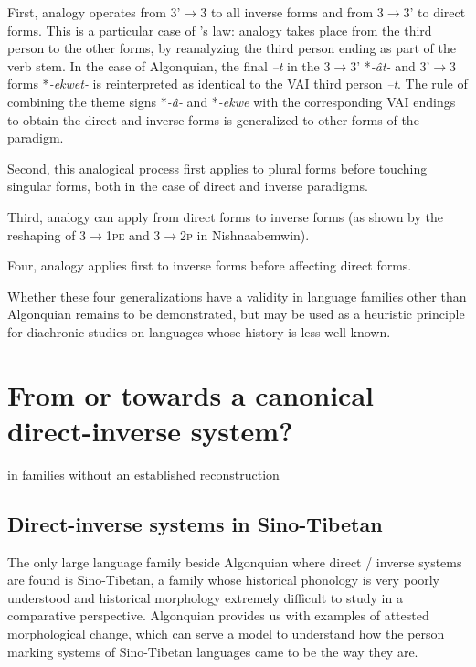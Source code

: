 \documentclass[twoside,a4paper,11pt]{article}
\newcommand{\ipa}[1]{{\phon\textit{#1}}}
\newcommand{\Σ}{\greek{Σ}}
\begin{document}
First, analogy operates from 3'$\rightarrow$3 to all inverse forms and from 3$\rightarrow$3' to direct forms. This is a particular case of   \citealt{watkins62celtic}'s law: analogy takes place from the third person to the other forms, by reanalyzing the third person ending as part of the verb stem. In the case of Algonquian, the final  \ipa{--t}  in the 3$\rightarrow$3' *\ipa{-ât-} and 3'$\rightarrow$3 forms *\ipa{-ekwet-} is reinterpreted as identical to the VAI third person \ipa{--t}.  The rule of combining the  theme signs *\ipa{-â-} and *\ipa{-ekwe}   with the corresponding VAI endings to obtain the direct and inverse forms  is generalized to other forms of the paradigm.

Second, this analogical process first applies to plural forms before touching singular forms, both in the case of direct and inverse paradigms.
 
Third, analogy can apply from direct forms to inverse forms (as shown by the reshaping of \textsc{3$\rightarrow$1pe} and \textsc{3$\rightarrow$2p} in Nishnaabemwin).

Four, analogy applies first to inverse forms before affecting direct forms.
 
 
 Whether these four generalizations have a validity in language families other than Algonquian remains to be demonstrated, but may be used as a heuristic principle for diachronic studies on languages whose history is less well known.
 
\section{From or towards a canonical direct-inverse system?}

in families without an established reconstruction

\subsection{Direct-inverse systems in Sino-Tibetan}

The only   large language family beside Algonquian where direct / inverse systems are found is Sino-Tibetan, a family whose historical phonology is very poorly understood and historical morphology extremely difficult to study in a comparative perspective. Algonquian provides us with examples of attested morphological change, which can serve a model to understand how the person marking systems of Sino-Tibetan languages came to be the way they are.
\end{document}
